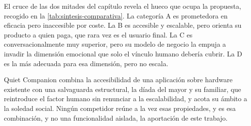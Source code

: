 El cruce de las dos mitades del capítulo revela el hueco que ocupa la propuesta, recogido en la
\autoref{tab:sintesis-comparativa}. La categoría A es prometedora en eficacia pero inaccesible por coste. La
B es accesible y escalable, pero orienta su producto a quien paga, que rara vez es el usuario final. La C es
conversacionalmente muy superior, pero su modelo de negocio la empuja a invadir la dimensión emocional que
solo el vínculo humano debería cubrir. La D es la más adecuada para esa dimensión, pero no escala.

Quiet Companion combina la accesibilidad de una aplicación sobre hardware existente con una salvaguarda
estructural, la díada del mayor y su familiar, que reintroduce el factor humano sin renunciar a la
escalabilidad, y acota su ámbito a la soledad social. Ningún competidor reúne a la vez esas propiedades, y es
esa combinación, y no una funcionalidad aislada, la aportación de este trabajo.

